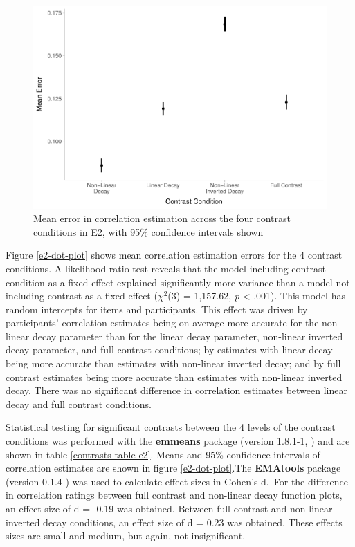 \documentclass[preprint, 3p,
authoryear]{elsarticle} %
\begin{document}
\begin{figure}

\includegraphics[width=0.5\linewidth]{contrast_and_scatterplots_files/figure-latex/e2-dot-plot-1} \hfill{}

\caption{\label{e2-dot-plot}Mean error in correlation estimation across the four contrast conditions in E2, with 95\% confidence intervals shown}\label{fig:e2-dot-plot}
\end{figure}

Figure \ref{e2-dot-plot} shows mean correlation estimation errors for
the 4 contrast conditions. A likelihood ratio test reveals that the
model including contrast condition as a fixed effect explained
significantly more variance than a model not including contrast as a
fixed effect (\(\chi^2\)(3) = 1,157.62, \emph{p} \textless{} .001). This
model has random intercepts for items and participants. This effect was
driven by participants' correlation estimates being on average more
accurate for the non-linear decay parameter than for the linear decay
parameter, non-linear inverted decay parameter, and full contrast
conditions; by estimates with linear decay being more accurate than
estimates with non-linear inverted decay; and by full contrast estimates
being more accurate than estimates with non-linear inverted decay. There
was no significant difference in correlation estimates between linear
decay and full contrast conditions.

Statistical testing for significant contrasts between the 4 levels of
the contrast conditions was performed with the \textbf{emmeans} package
(version 1.8.1-1, \citep{emmeans}) and are shown in table
\ref{contrasts-table-e2}. Means and 95\% confidence intervals of
correlation estimates are shown in figure \ref{e2-dot-plot}.The
\textbf{EMAtools} package (version 0.1.4 \citep{ematools}) was used to
calculate effect sizes in Cohen's d.~For the difference in correlation
ratings between full contrast and non-linear decay function plots, an
effect size of d = -0.19 was obtained. Between full contrast and
non-linear inverted decay conditions, an effect size of d = 0.23 was
obtained. These effects sizes are small and medium, but again, not
insignificant.
\end{document}
